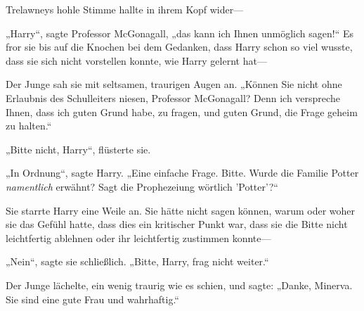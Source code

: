 Trelawneys hohle Stimme hallte in ihrem Kopf wider—


„Harry“, sagte Professor McGonagall, „das kann ich Ihnen unmöglich sagen!“ Es fror sie bis auf die Knochen bei dem Gedanken, dass Harry schon so viel wusste, dass sie sich nicht vorstellen konnte, wie Harry gelernt hat—

Der Junge sah sie mit seltsamen, traurigen Augen an. „Können Sie nicht ohne Erlaubnis des Schulleiters niesen, Professor McGonagall? Denn ich verspreche Ihnen, dass ich guten Grund habe, zu fragen, und guten Grund, die Frage geheim zu halten.“

„Bitte nicht, Harry“, flüsterte sie.

„In Ordnung“, sagte Harry. „Eine einfache Frage. Bitte. Wurde die Familie Potter \emph{namentlich} erwähnt? Sagt die Prophezeiung wörtlich 'Potter'?“

Sie starrte Harry eine Weile an. Sie hätte nicht sagen können, warum oder woher sie das Gefühl hatte, dass dies ein kritischer Punkt war, dass sie die Bitte nicht leichtfertig ablehnen oder ihr leichtfertig zustimmen konnte—

„Nein“, sagte sie schließlich. „Bitte, Harry, frag nicht weiter.“

Der Junge lächelte, ein wenig traurig wie es schien, und sagte: „Danke, Minerva. Sie sind eine gute Frau und wahrhaftig.“

